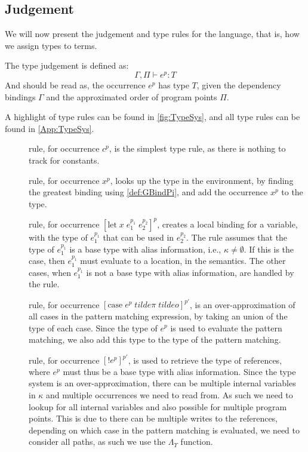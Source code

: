 \documentclass[../../master.tex]{subfiles}
\begin{document}
\subsection{Judgement}\label{sec:Judge}
We will now present the judgement and type rules for the language, that is, how we assign types to terms.

The type judgement is defined as:
$$\Gamma,\Pi\vdash e^p: T$$
And should be read as, the occurrence $e^p$ has type $T$, given the dependency bindings $\Gamma$ and the approximated order of program points $\Pi$.

A highlight of type rules can be found in \cref{fig:TypeSys}, and all type rules can be found in \cref{App:TypeSys}.

\begin{description}
	\item[] rule, for occurrence $c^p$, is the simplest type rule, as there is nothing to track for constants.

	\item[] rule, for occurrence $x^p$, looks up the type in the environment, by finding the greatest binding using \cref{def:GBindPi}, and add the occurrence $x^p$ to the type.

	\item[] rule, for occurrence $[\mbox{let}\;x\;e_1^{p_1}\;e_2^{p_2}]^p$, creates a local binding for a variable, with the type of $e_1^{p_1}$ that can be used in $e_2^{p_2}$.
		The  rule assumes that the type of $e_1^{p_1}$ is a base type with alias information, i.e., $\kappa\neq\emptyset$.
		If this is the case, then $e_1^{p_1}$ must evaluate to a location, in the semantics.
		The other cases, when $e_1^{p_1}$ is not a base type with alias information, are handled by the  rule.

	\item[] rule, for occurrence $[\mbox{case}\;e^{p}\;tilde{\pi}\;tilde{o}]^{p'}$, is an over-approximation of all cases in the pattern matching expression, by taking an union of the type of each case.
		Since the type of $e^p$ is used to evaluate the pattern matching, we also add this type to the type of the pattern matching.


	\item[] rule, for occurrence $[!e^{p}]^{p'}$, is used to retrieve the type of references, where $e^p$ must thus be a base type with alias information.
		Since the type system is an over-approximation, there can be multiple internal variables in $\kappa$ and multiple occurrences we need to read from.
		As such we need to lookup for all internal variables and also possible for multiple program points.
		This is due to there can be multiple writes to the references, depending on which case in the pattern matching is evaluated, we need to consider all paths, as such we use the $\Lambda_\Upsilon$ function.
\end{description}
\end{document}
